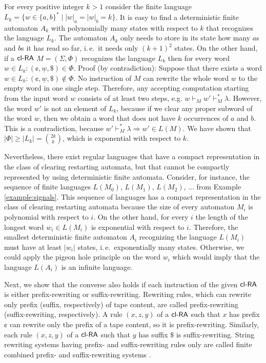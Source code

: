 \begin{example}\label{example:regular}
For every positive integer $k > 1$ consider the finite language $L_k = \{ w \in \{a, b\}^* \mid |w|_a = |w|_b = k \}$. It is easy to find a deterministic finite automaton $A_k$ with polynomially many states with respect to $k$ that recognizes the language $L_k$. The automaton $A_k$ only needs to store in its state how many $a$s and $b$s it has read so far, i.\,e.\ it needs only $(k+1)^2$ states. On the other hand, if a $\textup{\sf cl-RA\/}$ $M = (\Sigma, \Phi)$ recognizes the language $L_k$ then for every word $w \in L_k: (\cent, \underline{w}, \$) \in \Phi$. Proof (by contradiction): Suppose that there exists a word $w \in L_k: (\cent, \underline{w}, \$) \notin \Phi$. No instruction of $M$ can rewrite the whole word $w$ to the empty word in one single step. Therefore, any accepting computation starting from the input word $w$ consists of at least two steps, e.g. $w \vdash_M w' \vdash_M^* \lambda$.  However, the word $w'$ is not an element of $L_k$, because if we clear any proper subword of the word $w$, then we obtain a word that does not have $k$ occurrences of $a$ and $b$. This is a contradiction, because $w' \vdash_M^* \lambda \Rightarrow w' \in L(M)$. We have shown that $|\Phi| \ge |L_k| = \binom{2k}{k}$, which is exponential with respect to $k$.
\end{example}

Nevertheless, there exist regular languages that have a compact representation in the class of clearing restarting automata, but that cannot be compactly represented by using deterministic finite automata. Consider, for instance, the sequence of finite languages $L(M_0)$, $L(M_1)$, $L(M_2)$, $\ldots$ from Example \ref{example:signals}. This sequence of languages has a compact representation in the class of clearing restarting automata because the size of every automaton $M_i$ is polynomial with respect to $i$. On the other hand, for every $i$ the length of the longest word $w_i \in L(M_i)$ is exponential with respect to $i$. Therefore, the smallest deterministic finite automaton $A_i$ recognizing the language $L(M_i)$ must have at least $|w_i|$ states, i.\,e.\ exponentially many states. Otherwise, we could apply the pigeon hole principle on the word $w_i$ which would imply that the language $L(A_i)$ is an infinite language.

Next, we show that the converse also holds if each instruction of the given $\textup{\sf cl-RA\/}$ is either prefix-rewriting or suffix-rewriting. Rewriting rules, which can rewrite only prefix (suffix, respectively) of tape content, are called prefix-rewriting (suffix-rewriting, respectively). A rule $(x, z, y)$ of a $\textup{\sf cl-RA\/}$ such that $x$ has prefix $\cent$ can rewrite only the prefix of a tape content, so it is prefix-rewriting. Similarly, each rule $(x, z, y)$ of a $\textup{\sf cl-RA\/}$ such that $y$ has suffix $\$$ is suffix-rewriting. String rewriting systems having prefix- and suffix-rewriting rules only are called finite combined prefix- and suffix-rewriting systems \cite{Hofbauer2004301}.

